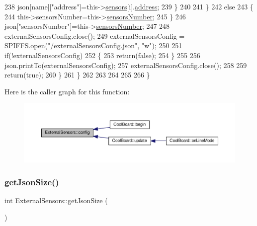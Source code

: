 \begin{DoxyCode}
238                     json[name][\textcolor{stringliteral}{"address"}]=this->\hyperlink{classExternalSensors_a284233f884fcf00154a44740cf1d9e1e}{sensors}[i].\hyperlink{structExternalSensors_1_1sensor_a8d70ca58524521ed054fc6b81eb58d34}{address};
239                 \}
240  
241             \}
242             \textcolor{keywordflow}{else}
243             \{
244                 this->sensorsNumber=this->\hyperlink{classExternalSensors_a58e4fbf9adeae787d92be5fa33043b5d}{sensorsNumber};
245             \}
246             json[\textcolor{stringliteral}{"sensorsNumber"}]=this->\hyperlink{classExternalSensors_a58e4fbf9adeae787d92be5fa33043b5d}{sensorsNumber};
247 
248             externalSensorsConfig.close();
249             externalSensorsConfig = SPIFFS.open(\textcolor{stringliteral}{"/externalSensorsConfig.json"}, \textcolor{stringliteral}{"w"});
250 
251             \textcolor{keywordflow}{if}(!externalSensorsConfig)
252             \{
253                 \textcolor{keywordflow}{return}(\textcolor{keyword}{false});
254             \}
255             
256             json.printTo(externalSensorsConfig);
257             externalSensorsConfig.close();
258             
259             \textcolor{keywordflow}{return}(\textcolor{keyword}{true}); 
260         \}
261     \}   
262     
263 
264 
265 
266 \}
\end{DoxyCode}
Here is the caller graph for this function\+:\nopagebreak
\begin{figure}[H]
\begin{center}
\leavevmode
\includegraphics[width=350pt]{classExternalSensors_a862a4bd11346b37270d0244c2adabe5a_icgraph}
\end{center}
\end{figure}
\mbox{\label{classExternalSensors_a8e3a93efa8f5a0477f300e26084b6625}} 
\subsubsection{\texorpdfstring{get\+Json\+Size()}{getJsonSize()}}
{\footnotesize\ttfamily int External\+Sensors\+::get\+Json\+Size (\begin{DoxyParamCaption}{ }\end{DoxyParamCaption})}


